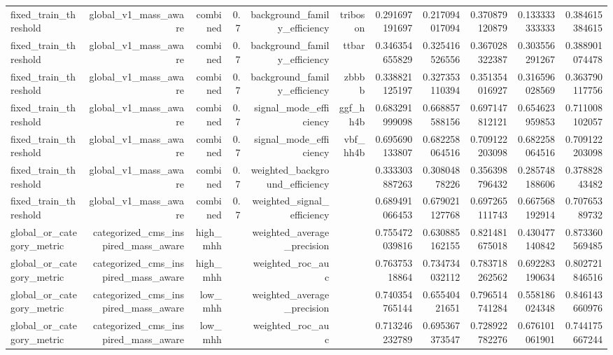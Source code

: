 \begin{table}[htbp]
{\begin{tabular}{lrrrrrrrrrr}
fixed\_train\_threshold & global\_v1\_mass\_aware & combined & 0.7 & background\_family\_efficiency & triboson & 0.291697191697 & 0.217094017094 & 0.370879120879 & 0.133333333333 & 0.384615384615 \\
fixed\_train\_threshold & global\_v1\_mass\_aware & combined & 0.7 & background\_family\_efficiency & ttbar & 0.346354655829 & 0.325416526556 & 0.367028322387 & 0.303556291267 & 0.388901074478 \\
fixed\_train\_threshold & global\_v1\_mass\_aware & combined & 0.7 & background\_family\_efficiency & zbbbb & 0.338821125197 & 0.327353110394 & 0.351354016927 & 0.316596028569 & 0.363790117756 \\
fixed\_train\_threshold & global\_v1\_mass\_aware & combined & 0.7 & signal\_mode\_efficiency & ggf\_hh4b & 0.683291999098 & 0.668857588156 & 0.697147812121 & 0.654623959853 & 0.711008102057 \\
fixed\_train\_threshold & global\_v1\_mass\_aware & combined & 0.7 & signal\_mode\_efficiency & vbf\_hh4b & 0.695690133807 & 0.682258064516 & 0.709122203098 & 0.682258064516 & 0.709122203098 \\
fixed\_train\_threshold & global\_v1\_mass\_aware & combined & 0.7 & weighted\_background\_efficiency &  & 0.333303887263 & 0.30804878226 & 0.356398796432 & 0.285748188606 & 0.37882843482 \\
fixed\_train\_threshold & global\_v1\_mass\_aware & combined & 0.7 & weighted\_signal\_efficiency &  & 0.689491066453 & 0.679021127768 & 0.697265111743 & 0.667568192914 & 0.70765389732 \\
global\_or\_category\_metric & categorized\_cms\_inspired\_mass\_aware & high\_mhh &  & weighted\_average\_precision &  & 0.755472039816 & 0.630885162155 & 0.821481675018 & 0.430477140842 & 0.873360569485 \\
global\_or\_category\_metric & categorized\_cms\_inspired\_mass\_aware & high\_mhh &  & weighted\_roc\_auc &  & 0.76375318864 & 0.734734032112 & 0.783718262562 & 0.692283190634 & 0.802721846516 \\
global\_or\_category\_metric & categorized\_cms\_inspired\_mass\_aware & low\_mhh &  & weighted\_average\_precision &  & 0.740354765144 & 0.65540421651 & 0.796514741284 & 0.558186024348 & 0.846143660976 \\
global\_or\_category\_metric & categorized\_cms\_inspired\_mass\_aware & low\_mhh &  & weighted\_roc\_auc &  & 0.713246232789 & 0.695367373547 & 0.728922782276 & 0.676101061901 & 0.744175667244 \\

\end{tabular}}
\end{table}
